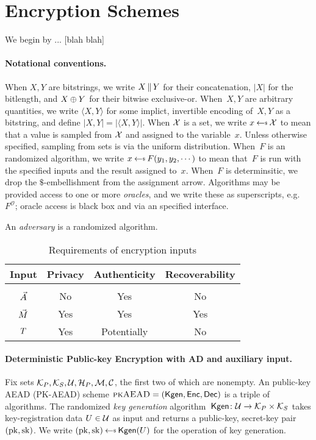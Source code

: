 \section{Encryption Schemes}
\label{sec:prelims}
\label{sec:encryption}
We begin by ... [blah blah]

\paragraph{Notational conventions. }When $X,Y$ are bitstrings, we write $X \,\|\, Y$ for their concatenation, $|X|$ for the bitlength, and $X\oplus Y$ for their bitwise exclusive-or.  When~$X,Y$ are arbitrary quantities, we write $\langle X,Y \rangle$ for some implict, invertible encoding of~$X,Y$ as a bitstring, and define $|X,Y|=|\langle X,Y\rangle|$.
When $\mathcal{X}$ is a set, we write $x \getsr \calX$ to mean that a value is sampled from $\mathcal{X}$ and assigned to the variable~$x$.  Unless otherwise specified, sampling from sets is via the uniform distribution.  
When~$F$ is an randomized algorithm, we write $x \getsr F(y_1,y_2,\cdots)$ to mean that~$F$ is run with the specified inputs and the result assigned to~$x$.  When~$F$ is determinsitic, we drop the $\$$-embellishment from the assignment arrow.  Algorithms may be provided access to one or more \emph{oracles}, and we write these as superscripts, e.g. $F^{\mathcal{O}}$; oracle access is black box and via an specified interface.  

An \emph{adversary} is a randomized algorithm.


\begin{table}[tp]
\centering
\begin{tabular}{c||c|c|c}
Input  & Privacy & Authenticity & Recoverability \\
\hline
&&&\\[-1.5ex]
$\vec{A}$      & No    & Yes        &  No \\
$\vec{M}$   & Yes   & Yes         & Yes \\ 
$T$    & Yes    & Potentially  &  No \\ [0.5ex]
\hline
\end{tabular}
\caption{Requirements of encryption inputs}
\end{table}

\paragraph{Deterministic Public-key Encryption with AD and auxiliary input. }
Fix sets $\mathcal{K}_P, \mathcal{K}_S, \mathcal{U}, \mathcal{H}_P, \mathcal{M},\mathcal{C}$, the first two of which are nonempty.  An public-key AEAD
(PK-AEAD) scheme $\textsc{pkAEAD}=(\mathsf{Kgen},{\mathsf{Enc}},{\mathsf{Dec}})$ is a triple of algorithms.  The randomized \emph{key generation} algorithm~$\mathsf{Kgen}\colon\mathcal{U}\to\mathcal{K}_P\times\mathcal{K}_S$ takes key-registration data $U \in \mathcal{U}$ as input and returns a public-key, secret-key pair $(\mathrm{pk},\mathrm{sk})$.  We write $(\pk,\sk)\getsr\Kgen(\kreg)$ for the operation of key generation. 

